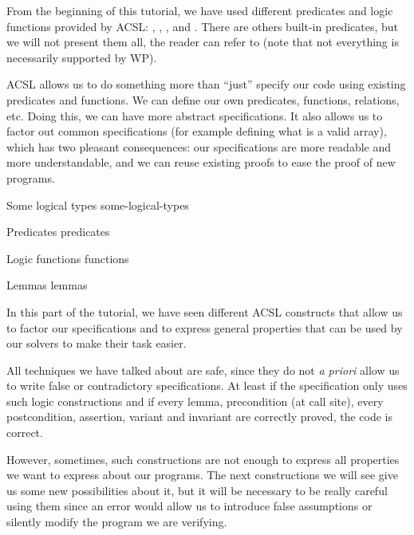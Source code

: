 From the beginning of this tutorial, we have used different predicates
and logic functions provided by ACSL: ,
, ,
 and . There are others
built-in predicates, but we will not present them all, the reader can refer to
(note that not everything is necessarily supported by WP).



ACSL allows us to do something more than ``just'' specify our code using
existing predicates and functions. We can define our own predicates,
functions, relations, etc. Doing this, we can have more abstract
specifications. It also allows us to factor out common specifications (for example
defining what is a valid array), which has two pleasant consequences:
our specifications are more readable and more understandable, and we can
reuse existing proofs to ease the proof of new programs.



\begin{levelTwo}
  {Some logical types}
  {some-logical-types}
\end{levelTwo}

\begin{levelTwo}
  {Predicates}
  {predicates}
\end{levelTwo}

\begin{levelTwo}
  {Logic functions}
  {functions}
\end{levelTwo}

\begin{levelTwo}
  {Lemmas}
  {lemmas}
\end{levelTwo}

\horizontalLine
\newpage

In this part of the tutorial, we have seen different ACSL constructs that
allow us to factor our specifications and to express general properties
that can be used by our solvers to make their task easier.




All techniques we have talked about are safe, since they do not \emph{a
priori} allow us to write false or contradictory specifications. At
least if the specification only uses such logic constructions and if
every lemma, precondition (at call site), every postcondition,
assertion, variant and invariant are correctly proved, the code is
correct.




However, sometimes, such constructions are not enough to express all
properties we want to express about our programs. The next constructions
we will see give us some new possibilities about it, but it will be
necessary to be really careful using them since an error would allow us
to introduce false assumptions or silently modify the program we are
verifying.
